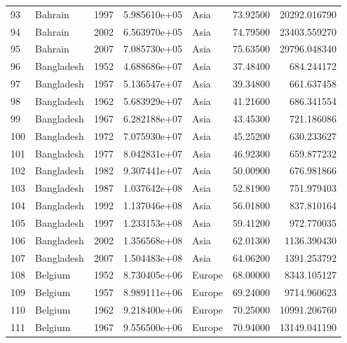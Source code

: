 \documentclass[
  letterpaper,
  DIV=11,
  numbers=noendperiod]{scrreprt}
\begin{document}
\begin{tabular}{llrrlrr}
93   &                   Bahrain &  1997 &  5.985610e+05 &      Asia &  73.92500 &   20292.016790 \\
94   &                   Bahrain &  2002 &  6.563970e+05 &      Asia &  74.79500 &   23403.559270 \\
95   &                   Bahrain &  2007 &  7.085730e+05 &      Asia &  75.63500 &   29796.048340 \\
96   &                Bangladesh &  1952 &  4.688686e+07 &      Asia &  37.48400 &     684.244172 \\
97   &                Bangladesh &  1957 &  5.136547e+07 &      Asia &  39.34800 &     661.637458 \\
98   &                Bangladesh &  1962 &  5.683929e+07 &      Asia &  41.21600 &     686.341554 \\
99   &                Bangladesh &  1967 &  6.282188e+07 &      Asia &  43.45300 &     721.186086 \\
100  &                Bangladesh &  1972 &  7.075930e+07 &      Asia &  45.25200 &     630.233627 \\
101  &                Bangladesh &  1977 &  8.042831e+07 &      Asia &  46.92300 &     659.877232 \\
102  &                Bangladesh &  1982 &  9.307441e+07 &      Asia &  50.00900 &     676.981866 \\
103  &                Bangladesh &  1987 &  1.037642e+08 &      Asia &  52.81900 &     751.979403 \\
104  &                Bangladesh &  1992 &  1.137046e+08 &      Asia &  56.01800 &     837.810164 \\
105  &                Bangladesh &  1997 &  1.233153e+08 &      Asia &  59.41200 &     972.770035 \\
106  &                Bangladesh &  2002 &  1.356568e+08 &      Asia &  62.01300 &    1136.390430 \\
107  &                Bangladesh &  2007 &  1.504483e+08 &      Asia &  64.06200 &    1391.253792 \\
108  &                   Belgium &  1952 &  8.730405e+06 &    Europe &  68.00000 &    8343.105127 \\
109  &                   Belgium &  1957 &  8.989111e+06 &    Europe &  69.24000 &    9714.960623 \\
110  &                   Belgium &  1962 &  9.218400e+06 &    Europe &  70.25000 &   10991.206760 \\
111  &                   Belgium &  1967 &  9.556500e+06 &    Europe &  70.94000 &   13149.041190 \\

\end{tabular}
\end{document}
